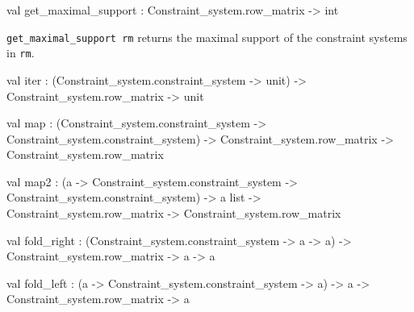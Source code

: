 \begin{ocamldocsigend}
\label{val:Constraint-underscoresystem.Row.get-underscoremaximal-underscoresupport}\begin{ocamldoccode}
val get_maximal_support : Constraint_system.row_matrix -> int
\end{ocamldoccode}
\begin{ocamldocdescription}
{\tt{get\_maximal\_support rm}} returns the maximal support of the constraint systems in {\tt{rm}}.


\end{ocamldocdescription}


\label{val:Constraint-underscoresystem.Row.iter}\begin{ocamldoccode}
val iter :
  (Constraint_system.constraint_system -> unit) ->
  Constraint_system.row_matrix -> unit
\end{ocamldoccode}


\label{val:Constraint-underscoresystem.Row.map}\begin{ocamldoccode}
val map :
  (Constraint_system.constraint_system -> Constraint_system.constraint_system) ->
  Constraint_system.row_matrix -> Constraint_system.row_matrix
\end{ocamldoccode}


\label{val:Constraint-underscoresystem.Row.map2}\begin{ocamldoccode}
val map2 :
  ({\textquotesingle}a ->
   Constraint_system.constraint_system -> Constraint_system.constraint_system) ->
  {\textquotesingle}a list -> Constraint_system.row_matrix -> Constraint_system.row_matrix
\end{ocamldoccode}


\label{val:Constraint-underscoresystem.Row.fold-underscoreright}\begin{ocamldoccode}
val fold_right :
  (Constraint_system.constraint_system -> {\textquotesingle}a -> {\textquotesingle}a) ->
  Constraint_system.row_matrix -> {\textquotesingle}a -> {\textquotesingle}a
\end{ocamldoccode}


\label{val:Constraint-underscoresystem.Row.fold-underscoreleft}\begin{ocamldoccode}
val fold_left :
  ({\textquotesingle}a -> Constraint_system.constraint_system -> {\textquotesingle}a) ->
  {\textquotesingle}a -> Constraint_system.row_matrix -> {\textquotesingle}a
\end{ocamldoccode}



\end{ocamldocsigend}
